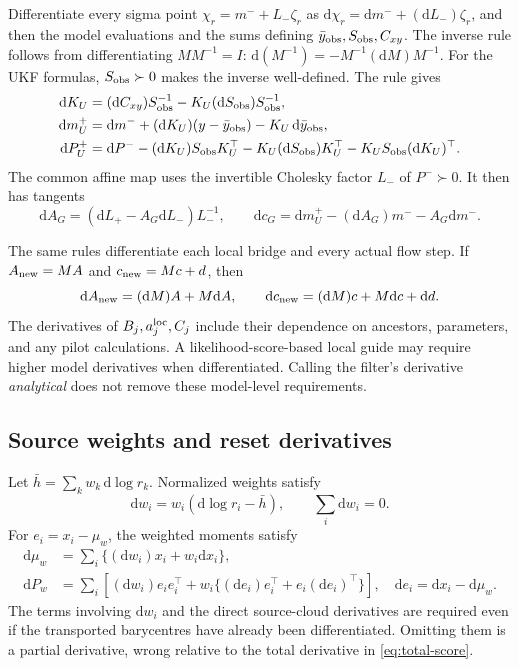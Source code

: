 \documentclass[11pt,a4paper]{article}
\newcommand{\dd}{\mathrm d}
\begin{document}
Differentiate every sigma point
\(\chi_r=m^-+L_-\zeta_r\) as
\(\dd\chi_r=\dd m^-+(\dd L_-)\zeta_r\), and then the model evaluations
and the sums defining \(\bar y_{\rm obs},S_{\rm obs},C_{xy}\).
The inverse rule follows from differentiating \(MM^{-1}=I\):
\(\dd(M^{-1})=-M^{-1}(\dd M)M^{-1}\).
For the UKF formulas, \(S_{\rm obs}\succ0\) makes the inverse
well-defined. The rule gives
\begin{align}
\label{eq:ukf-tangent}
 \dd K_U&=(\dd C_{xy})S_{\rm obs}^{-1}
                -K_U(\dd S_{\rm obs})S_{\rm obs}^{-1},\\
 \dd m_U^+&=\dd m^-+(\dd K_U)(y-\bar y_{\rm obs})
                   -K_U\,\dd\bar y_{\rm obs},\nonumber\\
 \dd P_U^+&=\dd P^--(\dd K_U)S_{\rm obs}K_U^\top
                    -K_U(\dd S_{\rm obs})K_U^\top
                    -K_US_{\rm obs}(\dd K_U)^\top.\nonumber
\end{align}
The common affine map uses the invertible Cholesky factor \(L_-\)
of \(P^-\succ0\). It then has tangents
\begin{equation}
\label{eq:global-tangent}
 \dd A_G=(\dd L_+-A_G\dd L_-)L_-^{-1},\qquad
 \dd c_G=\dd m_U^+-(\dd A_G)m^- -A_G\dd m^-.
\end{equation}

The same rules differentiate each local bridge and every actual flow
step. If \(A_{\rm new}=MA\) and \(c_{\rm new}=Mc+d\), then
\[
 \dd A_{\rm new}=(\dd M)A+M\dd A,\qquad
 \dd c_{\rm new}=(\dd M)c+M\dd c+\dd d .
\]
The derivatives of \(B_j,a_j^{\rm loc},C_j\) include their dependence on
ancestors, parameters, and any pilot calculations. A likelihood-score-based
local guide may require higher model derivatives when differentiated.
Calling the filter's derivative \emph{analytical} does not remove these
model-level requirements.

\subsection{Source weights and reset derivatives}

Let \(\bar h=\sum_kw_k\,\dd\log r_k\). Normalized weights satisfy
\begin{equation}
\label{eq:weight-tangent}
 \dd w_i=w_i(\dd\log r_i-\bar h),\qquad \sum_i\dd w_i=0.
\end{equation}
For \(e_i=x_i-\mu_w\), the weighted moments satisfy
\begin{align}
\label{eq:weighted-moment-tangent}
 \dd\mu_w
   &=\sum_i\{(\dd w_i)x_i+w_i\dd x_i\},\\
 \dd P_w
   &=\sum_i\left[
      (\dd w_i)e_ie_i^\top+
      w_i\{(\dd e_i)e_i^\top+e_i(\dd e_i)^\top\}\right],
 \quad \dd e_i=\dd x_i-\dd\mu_w.\nonumber
\end{align}
The terms involving \(\dd w_i\) and the direct source-cloud derivatives
are required even if the transported barycentres have already been
differentiated. Omitting them is a partial derivative, wrong relative to
the total derivative in \eqref{eq:total-score}.
\end{document}
